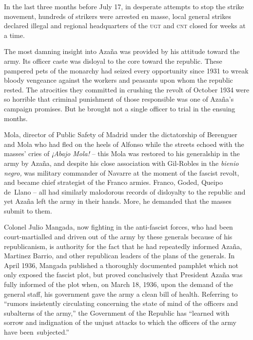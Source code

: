 \indexUGT\indexCNT
In the last three months before July 17, in desperate attempts to stop the strike movement, hundreds of strikers were arrested en masse, local general strikes declared illegal and regional headquarters of the \textsc{ugt} and \textsc{cnt} closed for weeks at a time.

\indexMAzana{}
The most damning insight into Azaña was provided by his attitude toward the army. Its officer caste was disloyal to the core toward the republic. These pampered pets of the monarchy had seized every opportunity since 1931 to wreak bloody vengeance against the workers and peasants upon whom the republic rested. The atrocities they committed in crushing the revolt of October 1934 were so horrible that criminal punishment of those responsible was one of Azaña’s campaign promises. But he brought not a single officer to trial in the ensuing months.

Mola, director of Public Safety of Madrid under the dictatorship of Berenguer and Mola who had fled on the heels of Alfonso while the streets echoed with the masses’ cries of \emph{¡Abajo Mola!} -- this Mola was restored to his generalship in the army by Azaña, and despite his close association with Gil-Robles in the \emph{bienio negro,} was military commander of Navarre at the moment of the fascist revolt, and became chief strategist of the Franco armies. Franco, Goded, Queipo de~Llano -- all had similarly malodorous records of disloyalty to the republic and yet Azaña left the army in their hands. More, he demanded that the masses submit to them. 

\indexMAzana
Colonel Julio Mangada, now fighting in the anti-fascist forces, who had been court-martialled and driven out of the army by these generals because of his republicanism, is authority for the fact that he had repeatedly informed Azaña, Martinez Barrio, and other republican leaders of the plans of the generals. In April 1936, Mangada published a thoroughly documented pamphlet which not only exposed the fascist plot, but proved conclusively that President Azaña was fully informed of the plot when, on March 18, 1936, upon the demand of the general staff, his government gave the army a clean bill of health. Referring to ``rumors insistently circulating concerning the state of mind of the officers and subalterns of the army,'' the Government of the Republic has ``learned with sorrow and indignation of the unjust attacks to which the officers of the army have been~subjected.''

